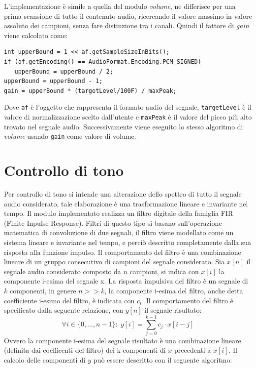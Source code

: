\documentclass[a4papper]{article}
\begin{document}
L'implementazione \`e simile a quella del modulo \emph{volume}, ne
differisce per una prima scansione di tutto il contenuto audio,
ricercando il valore massimo in valore assoluto dei campioni, senza
fare distinzione tra i canali. Quindi il fattore di \emph{gain} viene
calcolato come:
\begin{lstlisting}
int upperBound = 1 << af.getSampleSizeInBits();
if (af.getEncoding() == AudioFormat.Encoding.PCM_SIGNED)
   upperBound = upperBound / 2;
upperBound = upperBound - 1;
gain = upperBound * (targetLevel/100F) / maxPeak;
\end{lstlisting}
Dove \verb+af+ \`e l'oggetto che rappresenta il formato audio del
segnale, \verb+targetLevel+ \`e il valore di normalizzazione scelto
dall'utente e \verb+maxPeak+ \`e il valore del picco pi\`u alto
trovato nel segnale audio. Successivamente viene eseguito lo stesso
algoritmo di \emph{volume} usando \verb+gain+ come valore di volume.

\section{Controllo di tono}
Per controllo di tono si intende una alterazione dello spettro di
tutto il segnale audio considerato, tale elaborazione \`e una
trasformazione lineare e invariante nel tempo. Il modulo implementato
realizza un filtro digitale della famiglia FIR (Finite Inpulse
Response). Filtri di questo tipo si basano sull'operazione matematica
di convoluzione di due segnali, il filtro viene modellato come un
sistema lineare e invariante nel tempo, e perci\`o descritto
completamente dalla sua risposta alla funzione impulso. Il
comportamento del filtro \`e una combinazione lineare di un gruppo
consecutivo di campioni del segnale considerato. Sia $x[n]$ il segnale
audio considerato composto da $n$ campioni, si indica con $x[i]$ la
componente i-esima del segnale x. La risposta impulsiva del filtro \`e
un segnale di $k$ componenti, in genere $n >> k$, la componente
i-esima del filtro, anche detta coefficiente i-esimo del filtro, \`e
indicata con $c_i$. Il comportamento del filtro \`e specificato dalla
seguente relazione, con $y[n]$ il segnale risultato:
$$ \forall i \in \{0, \dots, n-1\} \colon \; y[i] = \sum_{j=0}^{k-1} c_j \cdot x[i-j] $$
Ovvero la componente i-esima del segnale risultato \`e una
combinazione lineare (definita dai coefficenti del filtro) dei k
componenti di $x$ precedenti a $x[i]$. Il calcolo delle componenti di
$y$ pu\`o essere descritto con il seguente algoritmo:\\
\end{document}
